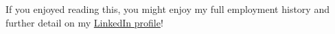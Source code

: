 \begin{justify}
If you enjoyed reading this, you might enjoy my full employment history and further detail on my \href{https://uk.linkedin.com/in/laywill}{LinkedIn profile}!
\end{justify}
\vspace{-\topsep} %
\sectionsep{}
